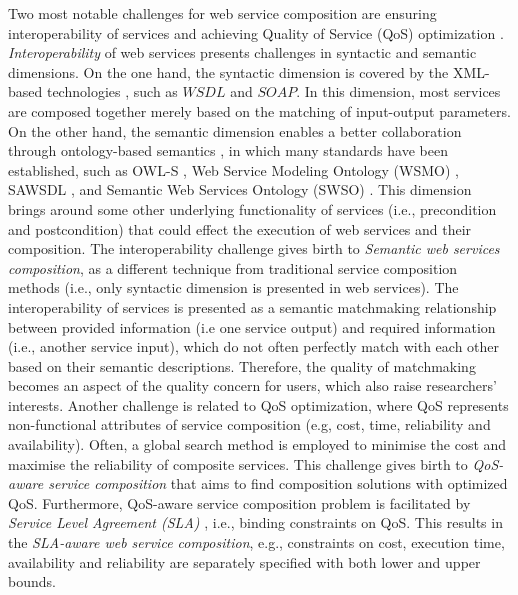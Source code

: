 Two most notable challenges for web service composition are ensuring interoperability of services and achieving Quality of Service (QoS) optimization \cite{fensel2011semantic}. \emph{Interoperability} of web services presents challenges in syntactic and semantic dimensions. On the one hand, the syntactic dimension is covered by the XML-based technologies \cite{yu2008deploying}, such as $WSDL$ and $SOAP$. In this dimension, most services are composed together merely based on the matching of input-output parameters. On the other hand, the semantic dimension enables a better collaboration through ontology-based semantics \cite{o2005review}, in which many standards have been established, such as OWL-S \cite{martin2004owl}, Web Service Modeling Ontology (WSMO) \cite{lausen2005w3c}, SAWSDL \cite{kopecky2007sawsdl}, and Semantic Web Services Ontology (SWSO) \cite{petrie2016web}. This dimension brings around some other underlying functionality of services (i.e., precondition and postcondition) that could effect the execution of web services and their composition. The interoperability challenge gives birth to \emph{Semantic web services composition}, as a different technique from traditional service composition methods (i.e., only syntactic dimension is presented in web services). The interoperability of services is presented as a semantic matchmaking relationship between provided information (i.e one service output) and required information (i.e., another service input), which do not often perfectly match with each other based on their semantic descriptions. Therefore, the quality of matchmaking becomes an aspect of the quality concern for users, which also raise researchers' interests. Another challenge is related to QoS optimization, where QoS represents non-functional attributes of service composition (e.g, cost, time, reliability and availability). Often, a global search method is employed to minimise the cost and maximise the reliability of composite services. This challenge gives birth to \emph{QoS-aware service composition} that aims to find composition solutions with optimized QoS. Furthermore, QoS-aware service composition problem is facilitated by \emph{Service Level Agreement (SLA)} \cite{sahai2002automated}, i.e., binding constraints on QoS. This results in the \emph{SLA-aware web service composition}, e.g., constraints on cost, execution time, availability and reliability are separately specified with both lower and upper bounds.

